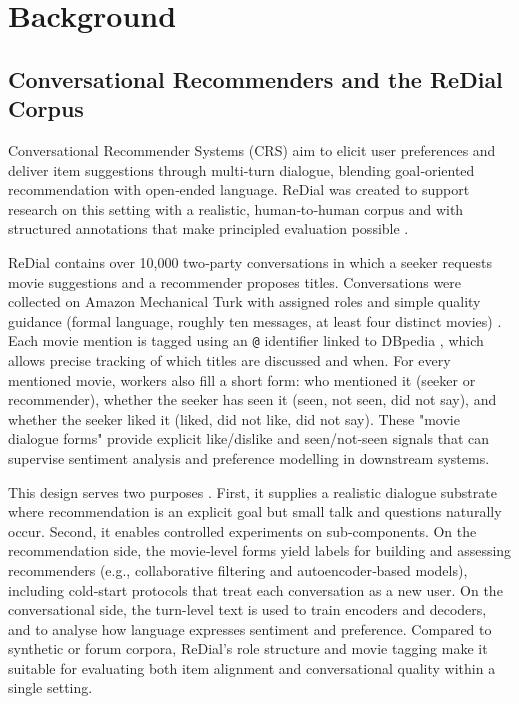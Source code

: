 \documentclass[12pt]{article}
\begin{document}
  
  \section{Background}
  \subsection{Conversational Recommenders and the ReDial Corpus}
  Conversational Recommender Systems (CRS) aim to elicit user preferences and deliver item suggestions through multi‑turn dialogue, blending goal‑oriented recommendation with open‑ended language. ReDial was created to support research on this setting with a realistic, human‑to‑human corpus and with structured annotations that make principled evaluation possible \citep{charlin2018redial}.

  ReDial contains over 10{,}000 two‑party conversations in which a seeker requests movie suggestions and a recommender proposes titles. Conversations were collected on Amazon Mechanical Turk with assigned roles and simple quality guidance (formal language, roughly ten messages, at least four distinct movies) \citep[§3]{charlin2018redial}. Each movie mention is tagged using an \texttt{@} identifier linked to DBpedia \citep{lehmann2015dbpedia}, which allows precise tracking of which titles are discussed and when. For every mentioned movie, workers also fill a short form: who mentioned it (seeker or recommender), whether the seeker has seen it (seen, not seen, did not say), and whether the seeker liked it (liked, did not like, did not say). These "movie dialogue forms" provide explicit like/dislike and seen/not‑seen signals that can supervise sentiment analysis and preference modelling in downstream systems.

  This design serves two purposes \citep{charlin2018redial}. First, it supplies a realistic dialogue substrate where recommendation is an explicit goal but small talk and questions naturally occur. Second, it enables controlled experiments on sub‑components. On the recommendation side, the movie‑level forms yield labels for building and assessing recommenders (e.g., collaborative filtering and autoencoder‑based models), including cold‑start protocols that treat each conversation as a new user. On the conversational side, the turn-level text is used to train encoders and decoders, and to analyse how language expresses sentiment and preference. Compared to synthetic or forum corpora, ReDial's role structure and movie tagging make it suitable for evaluating both item alignment and conversational quality within a single setting.
\end{document}
